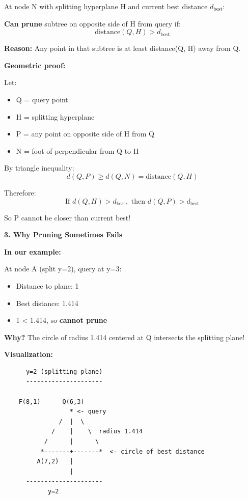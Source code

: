 \documentclass[12pt]{article}
\begin{document}
\begin{explanation}
\begin{center}
{\begin{minipage}{0.9\textwidth}
At node N with splitting hyperplane H and current best distance $d_{\text{best}}$:

\textbf{Can prune} subtree on opposite side of H from query if:
\[
\text{distance}(Q, H) > d_{\text{best}}
\]

\textbf{Reason:} Any point in that subtree is at least distance(Q, H) away from Q.
\end{minipage}
}
\end{center}

\textbf{Geometric proof:}

Let:
\begin{itemize}
    \item Q = query point
    \item H = splitting hyperplane
    \item P = any point on opposite side of H from Q
    \item N = foot of perpendicular from Q to H
\end{itemize}

By triangle inequality:
\[
d(Q, P) \geq d(Q, N) = \text{distance}(Q, H)
\]

Therefore:
\[
\text{If } d(Q, H) > d_{\text{best}}, \text{ then } d(Q, P) > d_{\text{best}}
\]

So P cannot be closer than current best!

\textbf{3. Why Pruning Sometimes Fails}

\textbf{In our example:}

At node A (split y=2), query at y=3:
\begin{itemize}
    \item Distance to plane: 1
    \item Best distance: 1.414
    \item 1 < 1.414, so \textbf{cannot prune}
\end{itemize}

\textbf{Why?} The circle of radius 1.414 centered at Q intersects the splitting plane!

\textbf{Visualization:}

\begin{verbatim}
      y=2 (splitting plane)
      ---------------------

    F(8,1)      Q(6,3)
                  * <- query
               /  |  \
             /    |    \  radius 1.414
           /      |      \
          *-------+-------*  <- circle of best distance
         A(7,2)   |
                  |
      ---------------------
            y=2


\end{verbatim}
\end{explanation}
\end{document}

